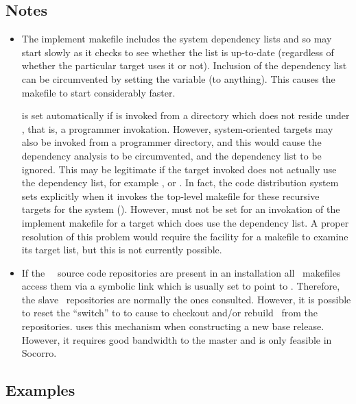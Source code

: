 \subsection*{Notes}

\begin{itemize}
\item
   The implement makefile includes the system dependency lists and so may
   start slowly as it checks to see whether the list is up-to-date (regardless
   of whether the particular target uses it or not).  Inclusion of the
   dependency list can be circumvented by setting the  variable
   (to anything).  This causes the makefile to start considerably faster.

    is set automatically if  is invoked from a
   directory which does not reside under , that is, a
   programmer invokation.  However, system-oriented targets may also be
   invoked from a programmer directory, and this would cause the dependency
   analysis to be circumvented, and the dependency list to be ignored.  This
   may be legitimate if the target invoked does not actually use the
   dependency list, for example ,  or
   .  In fact, the code distribution system sets 
   explicitly when it invokes the top-level makefile for these recursive
   targets for the system ().  However,  must not
   be set for an invokation of the implement makefile for a target which does
   use the dependency list.  A proper resolution of this problem would require
   the facility for a makefile to examine its target list, but this is not
   currently possible.

\item
   If the \aipspp\ \rcs\ source code repositories are present in an
   installation all \aipspp\ makefiles access them via a symbolic link
    which is usually set to point to .
   Therefore, the slave \rcs\ repositories are normally the ones consulted.
   However, it is possible to reset the  ``switch'' to 
   to cause  to checkout and/or rebuild \aipspp\ from the
    repositories.   uses this mechanism when
   constructing a new base release.  However, it requires good bandwidth to
   the master and is only feasible in Socorro.
\end{itemize}

\subsection*{Examples}

